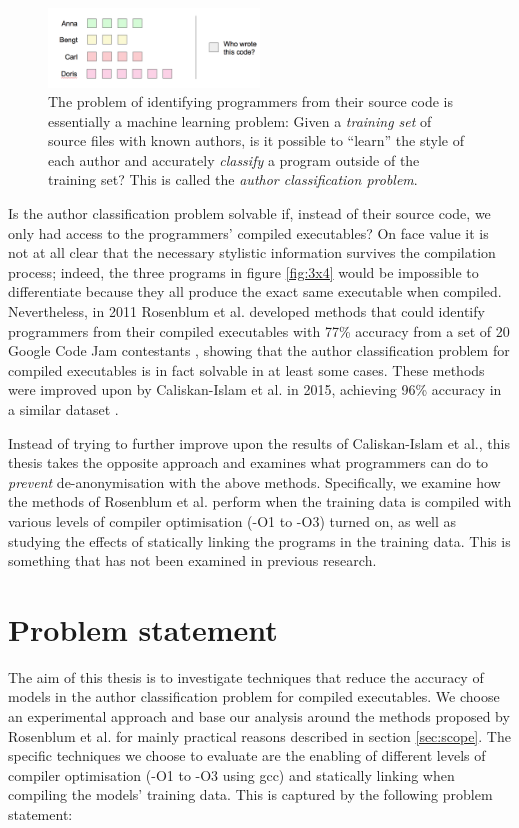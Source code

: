 \documentclass[a4paper,11pt]{kth-mag}
\begin{document}
\begin{figure}[!htb]
    \centering
    \includegraphics[width=0.5\textwidth]{id-ml}
    \caption{The problem of identifying programmers from their source code is
    essentially a machine learning problem: Given a \emph{training set} of
    source files with known authors, is it possible to ``learn'' the style of
    each author and accurately \emph{classify} a program outside of the
    training set? This is called the \emph{author classification problem}. }
    \label{fig:id-ml}
\end{figure}

Is the author classification problem solvable if, instead of their source code,
we only had access to the programmers' compiled executables? On face value it
is not at all clear that the necessary stylistic information survives the
compilation process; indeed, the three programs in figure \ref{fig:3x4} would
be impossible to differentiate because they all produce the exact same
executable when compiled. Nevertheless, in 2011 Rosenblum et al. developed
methods that could identify programmers from their compiled executables 
with 77\% accuracy from a set of 20 Google Code Jam contestants
\parencite{rosenblum2011wrote}, showing that the author classification problem
for compiled executables is in fact solvable in at least some cases. These
methods were improved upon by Caliskan-Islam et al. in 2015, achieving 96\%
accuracy in a similar dataset \parencite{caliskan2015coding}. 

Instead of trying to further improve upon the results of Caliskan-Islam et al.,
this thesis takes the opposite approach and examines what programmers can do to
\emph{prevent} de-anonymisation with the above methods. Specifically, we
examine how the methods of Rosenblum et al. \parencite{rosenblum2011wrote}
perform when the training data is compiled with various levels of compiler
optimisation (-O1 to -O3) turned on, as well as studying the effects of
statically linking the programs in the training data. This is something that
has not been examined in previous research.

\section{Problem statement}
The aim of this thesis is to investigate techniques that reduce the accuracy of
models in the author classification problem for compiled executables. We choose
an experimental approach and base our analysis around the methods proposed by
Rosenblum et al. \parencite{rosenblum2011wrote} for mainly practical reasons
described in section \ref{sec:scope}. The specific techniques we choose to
evaluate are the enabling of different levels of compiler optimisation (-O1 to
-O3 using gcc) and statically linking when compiling the models' training
data. This is captured by the following problem statement: 
\end{document}
